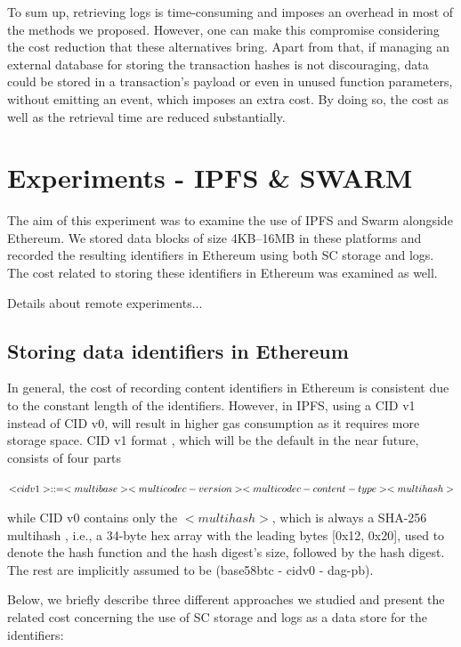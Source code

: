 To sum up, retrieving logs is time-consuming and imposes an overhead in most of the methods we proposed. However, one can make this compromise considering the cost reduction that these alternatives bring. Apart from that, if managing an external database for storing the transaction hashes is not discouraging, data could be stored in a transaction’s payload or even in unused function parameters, without emitting an event, which imposes an extra cost. By doing so, the cost as well as the retrieval time are reduced substantially.

\section{Experiments - IPFS \& SWARM}\label{sec:}
The aim of this experiment was to examine the use of IPFS and Swarm alongside Ethereum. We stored data blocks of size 4KB–16MB in these platforms and recorded the resulting identifiers in Ethereum using both SC storage and logs. The cost related to storing these identifiers in Ethereum was examined as well. 

Details about remote experiments...
\subsection{Storing data identifiers in Ethereum}\label{subsection:}
In general, the cost of recording content identifiers in Ethereum is consistent due to the constant length of the identifiers. However, in IPFS, using a CID v1 instead of CID v0, will result in higher gas consumption as it requires more storage space. CID v1 format \citep{multiformat}, which will be the default in the near future, consists of four parts


\begin{flushleft}
\centering
$\textsc <cidv1> ::= <multibase><multicodec-version><multicodec-content-type><multihash>$
\end{flushleft}

while CID v0 contains only the \(\scriptstyle <multihash>\), which is always a SHA-256 multihash \citep{multiformat}, i.e., a 34-byte hex array with the leading bytes [0x12, 0x20], used to denote the hash function and the hash digest’s size, followed by the hash digest. The rest are implicitly assumed to be (base58btc - cidv0 - dag-pb).

Below, we briefly describe three different approaches we studied and present the related cost concerning the use of SC storage and logs as a data store for the identifiers:

